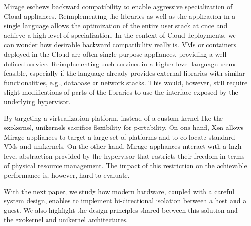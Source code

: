 Mirage eschews backward compatibility to enable aggressive specialization of Cloud appliances.
Reimplementing the libraries as well as the application in a single language allows the optimization of the entire user stack at once and achieve a high level of specialization.
In the context of Cloud deployments, we can wonder how desirable backward compatibility really is.
VMs or containers deployed in the Cloud are often single-purpose appliances, providing a well-defined service.
Reimplementing such services in a higher-level language seems feasible, especially if the language already provides external libraries with similar functionalities, e.g., database or network stacks.
This would, however, still require slight modifications of parts of the libraries to use the interface exposed by the underlying hypervisor.

By targeting a virtualization platform, instead of a custom kernel like the exokernel, unikernels sacrifice flexibility for portability.
On one hand, Xen allows Mirage appliances to target a large set of platforms and to co-locate standard VMs and unikernels.
On the other hand, Mirage appliances interact with a high level abstraction provided by the hypervisor that restricts their freedom in terms of physical resource management.
The impact of this restriction on the achievable performance is, however, hard to evaluate.

With the next paper, we study how modern hardware, coupled with a careful system design, enables to implement bi-directional isolation between a host and a guest.
We also highlight the design principles shared between this solution and the exokernel and unikernel architectures.


